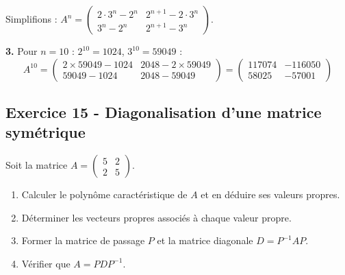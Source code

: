 \documentclass[12pt,a4paper]{article}
\begin{document}
\begin{boitecorrige}
Simplifions : $A^n = \begin{pmatrix}2\cdot3^n-2^n & 2^{n+1}-2\cdot3^n\\3^n-2^n & 2^{n+1}-3^n\end{pmatrix}$.

\textbf{3.} Pour $n=10$ : $2^{10} = 1024$, $3^{10} = 59049$ :
\[
A^{10} = \begin{pmatrix}2\times59049-1024 & 2048-2\times59049\\59049-1024 & 2048-59049\end{pmatrix}
= \begin{pmatrix}117074 & -116050\\58025 & -57001\end{pmatrix}
\]
\end{boitecorrige}


\subsection*{Exercice 15 - Diagonalisation d'une matrice symétrique \niveau{\moyen}}
\begin{boiteexercice}
Soit la matrice $A = \begin{pmatrix}5 & 2 \\ 2 & 5\end{pmatrix}$.

\begin{enumerate}
  \item Calculer le polynôme caractéristique de $A$ et en déduire ses valeurs propres.
  \item Déterminer les vecteurs propres associés à chaque valeur propre.
  \item Former la matrice de passage $P$ et la matrice diagonale $D = P^{-1}AP$.
  \item Vérifier que $A = PDP^{-1}$.
\end{enumerate}
\end{boiteexercice}
\end{document}
